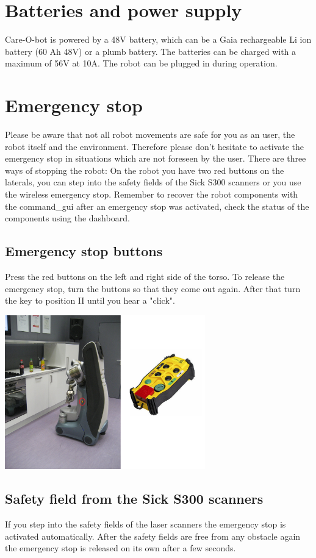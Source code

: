 \section{Batteries and power supply}
Care-O-bot is powered by a 48V battery, which can be a Gaia rechargeable Li ion battery (60 Ah 48V) or a plumb battery. The batteries can be charged with a maximum of 56V at 10A. The robot can be plugged in during operation.

\section{Emergency stop}\label{sec:emergency_stop}
Please be aware that not all robot movements are safe for you as an user, the robot itself and the environment. Therefore please don't hesitate to activate the emergency stop in situations which are not foreseen by the user. There are three ways of stopping the robot: On the robot you have two red buttons on the laterals, you can step into the safety fields of the Sick S300 scanners or you use the wireless emergency stop. Remember to recover the robot components with the command\_gui after an emergency stop was activated, check the status of the components using the dashboard.

\subsection{Emergency stop buttons}
Press the red buttons on the left and right side of the torso. To release the emergency stop, turn the buttons so that they come out again. After that turn the key to position II until you hear a "click".

\begin{center}
\includegraphics[width=0.65\textwidth]{images/em_stop.jpg}
\end{center}

\subsection{Safety field from the Sick S300 scanners}
If you step into the safety fields of the laser scanners the emergency stop is activated automatically. After the safety fields are free from any obstacle again the emergency stop is released on its own after a few seconds.

